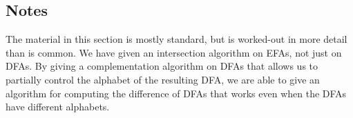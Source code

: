 \subsection{Notes}

The material in this section is mostly standard, but is worked-out in
more detail than is common.  We have given an intersection algorithm
on EFAs, not just on DFAs.  By giving a complementation algorithm on
DFAs that allows us to partially control the alphabet of the resulting
DFA, we are able to give an algorithm for computing the difference of
DFAs that works even when the DFAs have different alphabets.

